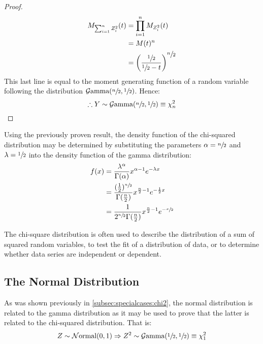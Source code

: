 \documentclass[12pt]{article}
\newcommand{\G}{\mathcal{G}}
\newcommand{\N}{\mathcal{N}}
\begin{document}
\begin{proof}
\begin{equation}
		\begin{split}
			M_{\sum^n_{i=1}Z^2_i}(t)	&=	\prod^n_{i=1}M_{Z^2_i}(t)\\
										&=	M(t)^n\\
										&=	\left(\frac{\sfrac{1}{2}}{\sfrac{1}{2}-t}\right)^{\displaystyle\sfrac{n}{2}}
		\end{split}
	\end{equation}
	This last line is equal to the moment generating function of a random variable following the distribution
	$\G\text{amma}(\sfrac{n}{2}, \sfrac{1}{2})$. Hence:
	\begin{equation}
		\therefore Y\sim\G\text{amma}(\sfrac{n}{2}, \sfrac{1}{2})\equiv \chi^2_n
	\end{equation}
\end{proof}

Using the previously proven result, the density function of the chi-squared distribution may be determined by
substituting the parameters $\alpha = \sfrac{n}{2}$ and $\lambda = \sfrac{1}{2}$ into the density function of the gamma
distribution:
\begin{equation}\label{eq:chisquared-density}
	\begin{split}
		f(x)	&=	\frac{\lambda^\alpha}{\Gamma(\alpha)}x^{\alpha-1}e^{-\lambda x}\\
				&=	\frac{(\frac{1}{2})^{\sfrac{n}{2}}}{\Gamma(\frac{n}{2})}x^{\frac{n}{2}-1}e^{-\frac{1}{2}x}\\
				&=	\frac{1}{2^{\sfrac{n}{2}}\Gamma(\frac{n}{2})}x^{\frac{n}{2}-1}e^{-\sfrac{x}{2}}
	\end{split}
\end{equation}

The chi-square distribution is often used to describe the distribution of a sum of squared random variables, to test the
fit of a distribution of data, or to determine whether data series are independent or dependent.


\pagebreak
\subsection{The Normal Distribution}\label{subsec:specialcases:normal}
As was shown previously in \autoref{subsec:specialcases:chi2}, the normal distribution is related to the gamma
distribution as it may be used to prove that the latter is related to the chi-squared distribution. That is:
\begin{equation}
	Z\sim\N\text{ormal}(0, 1)\Rightarrow Z^2\sim\G\text{amma}(\sfrac{1}{2}, \sfrac{1}{2})\equiv\chi^2_1
\end{equation}
\end{document}
